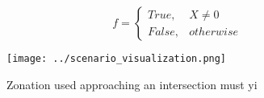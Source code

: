 \documentclass[a4paper]{article}
\begin{document}
\begin{equation}   f =
\begin{cases} True, & X \neq 0\\
False, & otherwise
\end{cases}
\end{equation}

\begin{figure}
\centering
\texttt{[image: ../scenario\_visualization.png]}
\caption{Zonation used approaching an intersection must yi
}
\end{figure}
 
\end{document}
